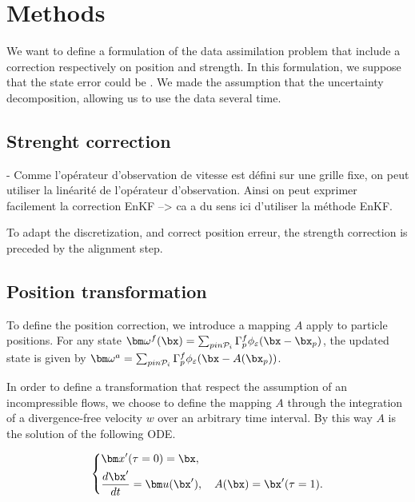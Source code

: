 
\section{Methods}

We want to define a formulation of the data assimilation problem that include a correction respectively on position and strength. In this formulation, we suppose that the state error could be .  We made the assumption that the uncertainty decomposition, allowing us to use the data several time.

\subsection*{Strenght correction}

- Comme l'opérateur d'observation de vitesse est défini sur une grille fixe, on peut utiliser la linéarité de l'opérateur d'observation. Ainsi on peut exprimer facilement la correction EnKF --> ca a du sens ici d'utiliser la méthode EnKF.

To adapt the discretization, and correct position erreur, the strength correction is preceded by the alignment step.

\subsection{Position transformation}

To define the position correction, we introduce a mapping $A$ apply to particle positions.
For any state $\bm \omega^f(\bx) = \sum_{p in \mathcal P_i} \Gamma_p ^f \phi_\varepsilon(\bx  - \bx_p)$, the updated state is given by  $\bm \omega^a = \sum_{p in \mathcal P_i} \Gamma_p ^f \phi_\varepsilon(\bx  - A(\bx_p))$.

In order to define a transformation that respect the assumption of an incompressible flows, we choose to define the mapping $A$ through the integration of a divergence-free velocity $w$ over an arbitrary time interval. By this way $A$ is the solution of the following ODE.

\begin{gather*}
    \left\{\begin{aligned}
         & \bm x'(\tau = 0) = \bx,                                        \\
         & \frac{d\bx'}{dt} = \bm u(\bx'), \quad A(\bx) = \bx'(\tau = 1).
    \end{aligned} \right.
\end{gather*}

